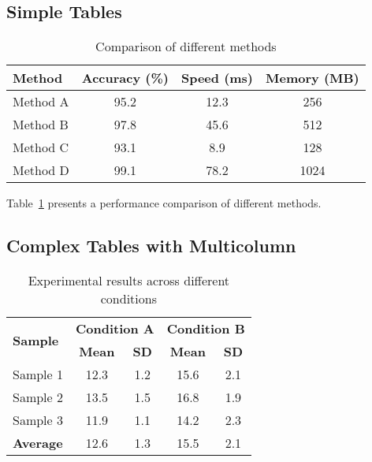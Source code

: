 \subsection*{Simple Tables}
\label{subsec:simple_tables}

\begin{table}[htbp]
	\centering
	\caption{Comparison of different methods}
	\label{tab:comparison}
	\begin{tabular}{lccc}
		\toprule
		\textbf{Method} & \textbf{Accuracy (\%)} & \textbf{Speed (ms)} & \textbf{Memory (MB)} \\
		\midrule
		Method A        & 95.2                   & 12.3                & 256                  \\
		Method B        & 97.8                   & 45.6                & 512                  \\
		Method C        & 93.1                   & 8.9                 & 128                  \\
		Method D        & 99.1                   & 78.2                & 1024                 \\
		\bottomrule
	\end{tabular}
\end{table}

Table~\ref{tab:comparison} presents a performance comparison of different methods.

\subsection*{Complex Tables with Multicolumn}
\label{subsec:complex_tables}

\begin{table}[htbp]
	\centering
	\caption{Experimental results across different conditions}
	\label{tab:experimental}
	\begin{tabular}{l|cc|cc}
		\toprule
		\multirow{2}{*}{\textbf{Sample}}          &
		\multicolumn{2}{c|}{\textbf{Condition A}} &
		\multicolumn{2}{c}{\textbf{Condition B}}                                                              \\
		                                          & \textbf{Mean} & \textbf{SD} & \textbf{Mean} & \textbf{SD} \\
		\midrule
		Sample 1                                  & 12.3          & 1.2         & 15.6          & 2.1         \\
		Sample 2                                  & 13.5          & 1.5         & 16.8          & 1.9         \\
		Sample 3                                  & 11.9          & 1.1         & 14.2          & 2.3         \\
		\midrule
		\textbf{Average}                          & 12.6          & 1.3         & 15.5          & 2.1         \\
		\bottomrule
	\end{tabular}
\end{table}

